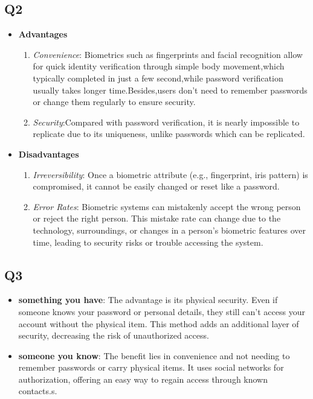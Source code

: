 \documentclass{article}
\begin{document}
\subsection{Q2}

	\begin{itemize}
		\item \textbf{Advantages}
		\begin{enumerate}
			\item \textit{Convenience}: Biometrics such as fingerprints and facial recognition allow for quick identity verification through simple body movement,which typically completed in just a few second,while password verification usually takes longer time.Besides,users don't need to remember passwords or change them regularly to ensure security.

			\item \textit{Security}:Compared with password verification, it is nearly impossible to replicate due to its uniqueness, unlike passwords which can be replicated.
		\end{enumerate}

		\item \textbf{Disadvantages}
		\begin{enumerate}
			\item \textit{Irreversibility}: Once a biometric attribute (e.g., fingerprint, iris pattern) is compromised, it cannot be easily changed or reset like a password.
			\item \textit{Error Rates}: Biometric systems can mistakenly accept the wrong person or reject the right person. This mistake rate can change due to the technology, surroundings, or changes in a person's biometric features over time, leading to security risks or trouble accessing the system\cite{o2003comparing}.
		\end{enumerate}


	\end{itemize}


\subsection{Q3}

	\begin{itemize}
		\item \textbf{something you have}: 
		The advantage is its physical security. Even if someone knows your password or personal details, they still can't access your account without the physical item. This method adds an additional layer of security, decreasing the risk of unauthorized access.

		\item \textbf{someone you know}:
		The benefit lies in convenience and not needing to remember passwords or carry physical items. It uses social networks for authorization, offering an easy way to regain access through known contacts.s.

	\end{itemize}
\end{document}
